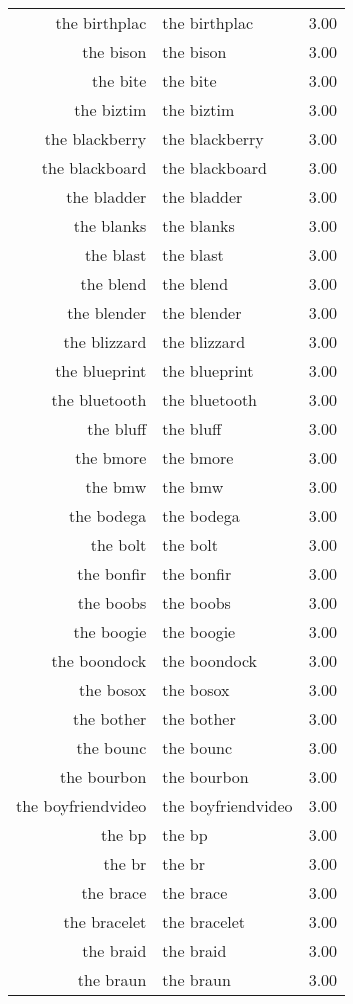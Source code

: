 \begin{table}[ht]
\begin{tabular}{rlr}
  the birthplac & the birthplac & 3.00 \\ 
  the bison & the bison & 3.00 \\ 
  the bite & the bite & 3.00 \\ 
  the biztim & the biztim & 3.00 \\ 
  the blackberry & the blackberry & 3.00 \\ 
  the blackboard & the blackboard & 3.00 \\ 
  the bladder & the bladder & 3.00 \\ 
  the blanks & the blanks & 3.00 \\ 
  the blast & the blast & 3.00 \\ 
  the blend & the blend & 3.00 \\ 
  the blender & the blender & 3.00 \\ 
  the blizzard & the blizzard & 3.00 \\ 
  the blueprint & the blueprint & 3.00 \\ 
  the bluetooth & the bluetooth & 3.00 \\ 
  the bluff & the bluff & 3.00 \\ 
  the bmore & the bmore & 3.00 \\ 
  the bmw & the bmw & 3.00 \\ 
  the bodega & the bodega & 3.00 \\ 
  the bolt & the bolt & 3.00 \\ 
  the bonfir & the bonfir & 3.00 \\ 
  the boobs & the boobs & 3.00 \\ 
  the boogie & the boogie & 3.00 \\ 
  the boondock & the boondock & 3.00 \\ 
  the bosox & the bosox & 3.00 \\ 
  the bother & the bother & 3.00 \\ 
  the bounc & the bounc & 3.00 \\ 
  the bourbon & the bourbon & 3.00 \\ 
  the boyfriendvideo & the boyfriendvideo & 3.00 \\ 
  the bp & the bp & 3.00 \\ 
  the br & the br & 3.00 \\ 
  the brace & the brace & 3.00 \\ 
  the bracelet & the bracelet & 3.00 \\ 
  the braid & the braid & 3.00 \\ 
  the braun & the braun & 3.00 \\ 

\end{tabular}
\end{table}

